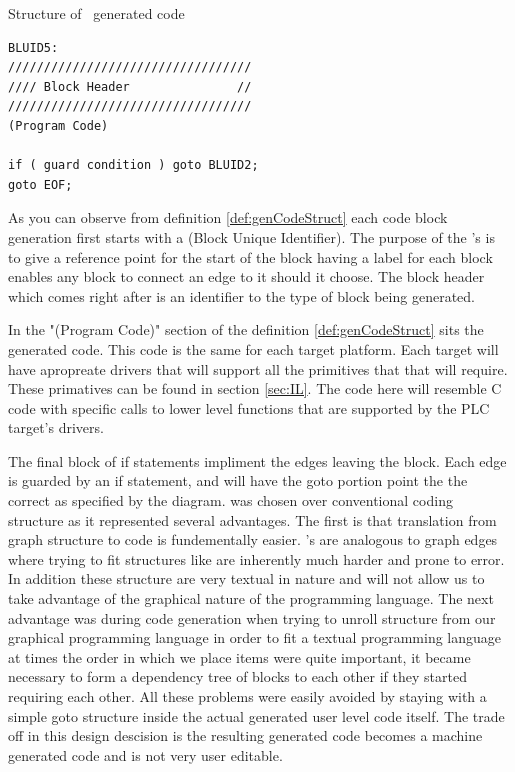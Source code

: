 \begin{definition}
\label{def:genCodeStruct}
Structure of \plcchart \  generated code

\begin{lstlisting}
BLUID5:
//////////////////////////////////
//// Block Header               //
//////////////////////////////////
(Program Code)

if ( guard condition ) goto BLUID2;
goto EOF;
\end{lstlisting}
\end{definition}

As you can observe from definition \ref{def:genCodeStruct} each code block generation first starts with a  (Block Unique Identifier). The purpose of the 's is to give a reference point for the start of the block having a  label for each block enables any block to connect an edge to it should it choose. The block header which comes right after is an identifier to the type of block being generated. 

In the "(Program Code)" section of the definition \ref{def:genCodeStruct} sits the generated  code. This code is the same for each target platform. Each  target will have apropreate drivers that will support all the primitives that that  will require. These primatives can be found in section \ref{sec:IL}. The code here will resemble C code with specific calls to lower level functions that are supported by the PLC target's drivers.

The final block of if statements impliment the edges leaving the block. Each edge is guarded by an if statement, and will have the goto portion point the the correct  as specified by the diagram.  was chosen over conventional coding structure as it represented several advantages. The first is that translation from graph structure to code is fundementally easier. 's are analogous to graph edges where trying to fit structures like   are inherently much harder and prone to error. In addition these structure are very textual in nature and will not allow us to take advantage of the graphical nature of the programming language. The next advantage was during code generation when trying to unroll structure from our graphical programming language in order to fit a textual programming language at times the order in which we place items were quite important, it became necessary to form a dependency tree of blocks to each other if they started requiring each other. All these problems were easily avoided by staying with a simple goto structure inside the actual generated user level  code itself. The trade off in this design descision is the resulting generated code becomes a machine generated code and is not very user editable. 

